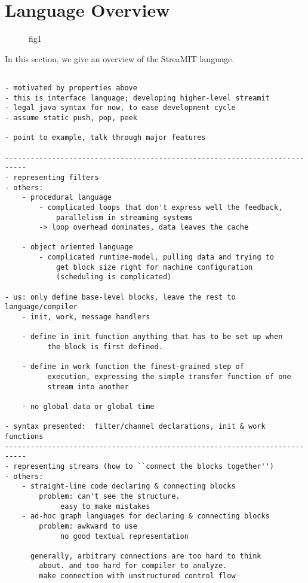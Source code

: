 \section{Language Overview}

\begin{figure*}
\centering
{}
\caption{ fig1}
\label{fig:data_structs}
\end{figure*}

In this section, we give an overview of the StreaMIT language.

\begin{verbatim}

- motivated by properties above
- this is interface language; developing higher-level streamit
- legal java syntax for now, to ease development cycle
- assume static push, pop, peek

- point to example, talk through major features

---------------------------------------------------------------------------
- representing filters 
- others:
	- procedural language
		- complicated loops that don't express well the feedback,
			parallelism in streaming systems
		-> loop overhead dominates, data leaves the cache

	- object oriented language
		- complicated runtime-model, pulling data and trying to 
			get block size right for machine configuration
			(scheduling is complicated)

- us: only define base-level blocks, leave the rest to language/compiler
	- init, work, message handlers

	- define in init function anything that has to be set up when
          the block is first defined.

	- define in work function the finest-grained step of
          execution, expressing the simple transfer function of one
          stream into another

	- no global data or global time

- syntax presented:  filter/channel declarations, init & work functions
---------------------------------------------------------------------------
- representing streams (how to ``connect the blocks together'')
- others:
	- straight-line code declaring & connecting blocks
		problem: can't see the structure.
			 easy to make mistakes
	- ad-hoc graph languages for declaring & connecting blocks
		problem: awkward to use
			 no good textual representation

	  generally, arbitrary connections are too hard to think
		about. and too hard for compiler to analyze.
		make connection with unstructured control flow


\end{verbatim}
